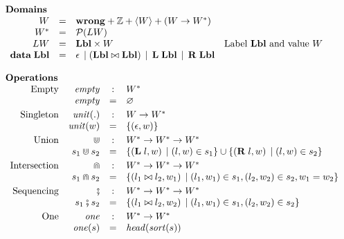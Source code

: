 \documentclass[acmsmall,review,dvipsnames]{acmart}
\newcommand{\vb}{\; \ensuremath{\mathop{\mid}} \;}    %
\newcommand{\tuple}[1]{\langle #1 \rangle}
\newcommand{\Value}{W}
\newcommand{\setform}[1]{\left\{ #1 \right\}}
\newcommand{\scompr}[2]{\{ #1 \vb #2 \}}
\newcommand{\sbind}[2]{ #1 \in #2 }
\newcommand{\mtype}{\Value^{*}}
\newcommand{\mempty}{\mathit{empty}}
\newcommand{\munit}{\mathit{unit}}
\newcommand{\munits}[1]{\munit(#1)}
\newcommand{\mintersect}{\Cap}
\newcommand{\munion}{\Cup}
\newcommand{\msemi}{\fatsemi}
\newcommand{\mone}{\mathit{one}}
\newcommand{\mtag}{\mathit{tag}}
\newcommand{\powerset}[1]{{\mathcal P}(#1)}
\newcommand{\wrong}{\mathbf{wrong}}
\begin{document}
\begin{figure}
$$
\begin{array}{l}
\text{\bf Domains} \\
\begin{array}{rcll}
\Value & = & \wrong + \mathbb{Z} + \tuple{\Value} + (\Value \rightarrow \mtype) \\
\mtype & = & \powerset{\LblValue} \\
\LblValue & = & \Lbl \times \Value & \text{Label $\Lbl$ and value $\Value$} \\
\textbf{data}\; \Lbl & = & \lblemp \vb (\lblseq{\Lbl}{\Lbl}) \vb \lbll{\Lbl} \vb \lblr{\Lbl} \\
\end{array} \\
\\
\text{\bf Operations} \\
\begin{array}{rrcll}
\text{Empty}        & \mempty & : &  \mtype \\
    & \mempty & = & \varnothing \\[1mm]
\text{Singleton}    & \munits{.} & : & \Value \rightarrow \mtype \\
     & \munits{w} & = & \setform{ (\lblemp, w) } \\[1mm]
\text{Union}        & \munion & : & \mtype \rightarrow \mtype \rightarrow \mtype \\
 &  s_1 \munion s_2 & = & \scompr{(\lbll{l},w)}{\sbind{(l,w)}{s_1}} \cup
                                              \scompr{(\lblr{l}, w)}{\sbind{(l,w)}{s_2}} \\[1mm]
\text{Intersection} & \mintersect & : & \mtype \rightarrow \mtype \rightarrow \mtype \\
 &  s_1 \mintersect s_2 & = & \scompr{(\lblseq{l_1}{l_2},w_1)}{\sbind{(l_1,w_1)}{s_1}, \sbind{(l_2,w_2)}{s_2}, w_1=w_2} \\[1mm]
\text{Sequencing} & \msemi & : & \mtype \rightarrow \mtype \rightarrow \mtype \\
&  s_1 \msemi s_2 & = & \scompr{(\lblseq{l_1}{l_2}, w_2)}{\sbind{(l_1,w_1)}{s_1}, \sbind{(l_2,w_2)}{s_2}} \\[1mm]
\text{One}  & \mone & : & \mtype \rightarrow \mtype \\
& \mone(s) & = & \shead (\msort( s)) \\[1mm]

\end{array}
\end{array}$$
\end{figure}
\end{document}
